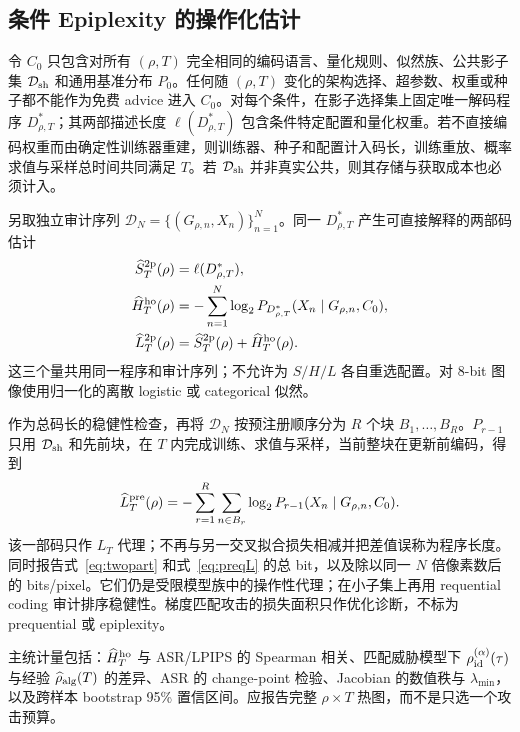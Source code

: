 \documentclass[conference,a4paper]{IEEEtran}
\begin{document}
\subsection{条件 Epiplexity 的操作化估计}

令 $C_0$ 只包含对所有 $(\rho,T)$ 完全相同的编码语言、量化规则、似然族、公共影子集 $\mathcal D_{\rm sh}$ 和通用基准分布 $P_0$。任何随 $(\rho,T)$ 变化的架构选择、超参数、权重或种子都不能作为免费 advice 进入 $C_0$。对每个条件，在影子选择集上固定唯一解码程序 $D^*_{\rho,T}$；其两部描述长度 $\ell(D^*_{\rho,T})$ 包含条件特定配置和量化权重。若不直接编码权重而由确定性训练器重建，则训练器、种子和配置计入码长，训练重放、概率求值与采样总时间共同满足 $T$。若 $\mathcal D_{\rm sh}$ 并非真实公共，则其存储与获取成本也必须计入。

另取独立审计序列 $\mathcal D_N=\{(G_{\rho,n},X_n)\}_{n=1}^N$。同一 $D^*_{\rho,T}$ 产生可直接解释的两部码估计
\begin{align}
\widehat S_T^{\rm 2p}(\rho)&=\ell(D^*_{\rho,T}),\\
\widehat H_T^{\rm ho}(\rho)&=-\sum_{n=1}^{N}
\log_2P_{D^*_{\rho,T}}(X_n\mid G_{\rho,n},C_0),\\
\widehat L_T^{\rm 2p}(\rho)&=\widehat S_T^{\rm 2p}(\rho)+
\widehat H_T^{\rm ho}(\rho).
\label{eq:twopart}
\end{align}
这三个量共用同一程序和审计序列；不允许为 $S/H/L$ 各自重选配置。对 8-bit 图像使用归一化的离散 logistic 或 categorical 似然。

作为总码长的稳健性检查，再将 $\mathcal D_N$ 按预注册顺序分为 $R$ 个块 $B_1,\ldots,B_R$。$P_{r-1}$ 只用 $\mathcal D_{\rm sh}$ 和先前块，在 $T$ 内完成训练、求值与采样，当前整块在更新前编码，得到
\begin{equation}
\widehat L_T^{\rm pre}(\rho)=
-\sum_{r=1}^{R}\sum_{n\in B_r}
\log_2P_{r-1}(X_n\mid G_{\rho,n},C_0).
\label{eq:preqL}
\end{equation}
该一部码只作 $L_T$ 代理；不再与另一交叉拟合损失相减并把差值误称为程序长度。同时报告式~\eqref{eq:twopart} 和式~\eqref{eq:preqL} 的总 bit，以及除以同一 $N$ 倍像素数后的 bits/pixel。它们仍是受限模型族中的操作性代理；在小子集上再用 requential coding 审计排序稳健性\cite{finzi2026epiplexity}。梯度匹配攻击的损失面积只作优化诊断，不标为 prequential 或 epiplexity。

主统计量包括：$\widehat H_T^{\rm ho}$ 与 ASR/LPIPS 的 Spearman 相关、匹配威胁模型下 $\rho_{\rm id}^{(\alpha)}(\tau)$ 与经验 $\widehat\rho_{\rm alg}(T)$ 的差异、ASR 的 change-point 检验、Jacobian 的数值秩与 $\lambda_{\min}$，以及跨样本 bootstrap 95\% 置信区间。应报告完整 $\rho\times T$ 热图，而不是只选一个攻击预算。
\end{document}
